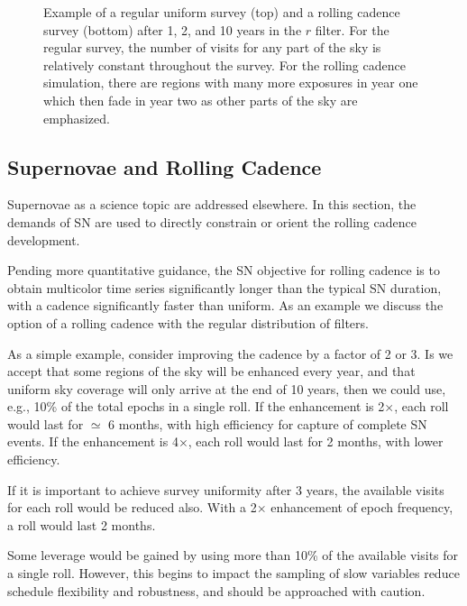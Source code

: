 \begin{figure}
  \caption{Example of a regular uniform survey (top) and a rolling cadence survey (bottom) after 1, 2, and 10 years in the $r$ filter.  For the regular survey, the number of visits for any part of the sky is relatively constant throughout the survey.  For the rolling cadence simulation, there are regions with many more exposures in year one which then fade in year two as other parts of the sky are emphasized.\label{fig:rollingcadence}}
\end{figure}

\subsection{Supernovae and Rolling Cadence}
\label{sec:rolling:supernovae}


Supernovae as a science topic are addressed elsewhere.
In this section, the demands of SN are used to directly constrain or
orient the rolling cadence development.

Pending more quantitative guidance, the SN objective for rolling cadence is to obtain multicolor time series significantly longer than the typical SN duration, with a cadence significantly faster than uniform.  As an example we discuss the option of a rolling cadence with the regular distribution of filters.

As a simple example, consider improving the cadence by a factor of 2 or 3.  Is we accept that some regions of the sky will be enhanced every year, and that uniform sky coverage will only arrive at the end of 10 years, then we could use, e.g., 10\% of the total epochs in a single roll.  If the enhancement is 2$\times$, each roll would last for $\simeq$ 6 months, with high efficiency for capture of complete SN events.  If the enhancement is 4$\times$, each roll would last for 2 months, with lower efficiency.

If it is important to achieve survey uniformity after 3 years, the available visits for each roll would be reduced also.  With a 2$\times$ enhancement of epoch frequency, a roll would last 2 months.

Some leverage would be gained by using more than 10\% of the available visits for a single roll.  However, this begins to impact the sampling of slow variables reduce schedule flexibility and robustness, and should be approached with caution.

